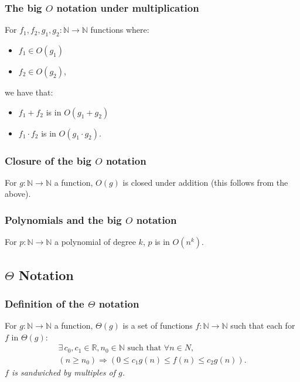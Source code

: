 \documentclass[a4paper, 12pt, twoside]{article}
\begin{document}
\subsubsection{The big $O$ notation under multiplication}

For $f_1, f_2, g_1, g_2 : \mathbb{N} \to \mathbb{N}$ functions where:
\begin{itemize}
      \item $f_1 \in O(g_1)$
      \item $f_2 \in O(g_2)$,
\end{itemize}
we have that:
\begin{itemize}
      \item $f_1 + f_2$ is in $O(g_1 + g_2)$
      \item $f_1 \cdot f_2$ is in $O(g_1 \cdot g_2)$.
\end{itemize}

\subsubsection{Closure of the big $O$ notation}

For $g : \mathbb{N} \to \mathbb{N}$ a function, $O(g)$ is closed
under addition (this follows from the above).

\subsubsection{Polynomials and the big $O$ notation}

For $p : \mathbb{N} \to \mathbb{N}$ a polynomial of degree $k$,
$p$ is in $O(n^k)$.

\subsection{$\Theta$ Notation}

\subsubsection{Definition of the $\Theta$ notation}

For $g : \mathbb{N} \to \mathbb{N}$ a function, $\Theta(g)$ is a set of
functions $f : \mathbb{N} \to \mathbb{N}$ such that each for
$f$ in $\Theta(g)$:
\begin{gather*}
      \exists \, c_0, c_1 \in \mathbb{R}, n_0 \in \mathbb{N}
      \text{ such that } \forall n \in N, \\
      (n \geq n_0) \Rightarrow (0 \leq c_1g(n) \leq f(n) \leq c_2g(n)).
\end{gather*}
\textit{$f$ is sandwiched by multiples of $g$.}
\end{document}
